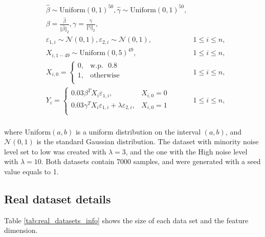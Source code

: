 \documentclass{article}
\begin{document}
\begin{appendices}
\begin{align*}
& \hat{\beta} \sim \textrm{Uniform} (0,1)^{50}, \hat{\gamma} \sim \textrm{Uniform}(0,1)^{50}, & \\
& \beta = \frac{\hat{\beta}}{\Vert\hat{\beta}\Vert_2}, \gamma = \frac{\hat{\gamma}}{\Vert\hat{\gamma}\Vert_2}, & \\
& \varepsilon_{1,i} \sim \mathcal{N}(0,1), \varepsilon_{2,i} \sim  \mathcal{N}(0,1), & 1 \leq i \leq n,\\
& X_{i, 1-49} \sim \textrm{Uniform}(0,5)^{49}, & 1\leq i \leq n,\\
& X_{i, 0} = \begin{cases} 
      0, & \textrm{w.p.}\text{ } 0.8 \\
      1, & \textrm{otherwise} \\
   \end{cases} & 1 \leq i \leq n, \\
& Y_i = \begin{cases} 
      0.03\beta^TX_i\varepsilon_{1,i}, & X_{i,0}=0 \\
      0.03\gamma^TX_i\varepsilon_{1,i} + \lambda \varepsilon_{2,i}, & X_{i,0}=1 \\
   \end{cases} & 1 \leq i \leq n, \\
\end{align*}

where Uniform$(a,b)$ is a uniform distribution on the interval $(a,b)$, and $\mathcal{N}(0,1)$ is the standard Gaussian distribution. The dataset with minority noise level set to low was created with $\lambda=3$, and the one with the High noise level with $\lambda=10$. Both datasets contain 7000 samples, and were generated with a seed value equals to 1.

\subsection{Real dataset details}\label{real_dataset_details}
Table \ref{tab:real_datasets_info} shows the size of each data set and the feature dimension.

\begin{table}[htbp]

\caption{Real datasets information. Number of samples and feature dimension of each real dataset we used in the experiments}
    \label{tab:real_datasets_info}
  \centering
{}
\end{table}
\end{appendices}
\end{document}
